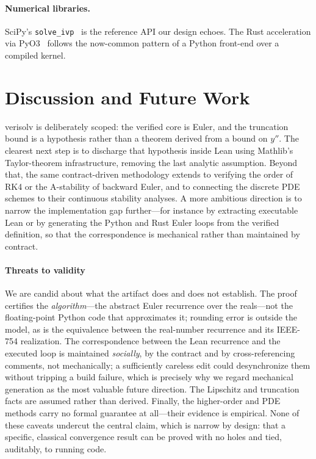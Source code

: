 \documentclass[sigplan,nonacm,screen,review]{acmart}
\begin{document}
\paragraph{Numerical libraries.}
SciPy's \texttt{solve\_ivp}~\cite{scipy2020} is the reference API our design
echoes. The Rust acceleration via PyO3~\cite{pyo3} follows the now-common pattern
of a Python front-end over a compiled kernel.

\section{Discussion and Future Work}
\label{sec:future}

verisolv is deliberately scoped: the verified core is Euler, and the truncation
bound is a hypothesis rather than a theorem derived from a bound on $y''$. The
clearest next step is to discharge that hypothesis inside Lean using Mathlib's
Taylor-theorem infrastructure, removing the last analytic assumption. Beyond
that, the same contract-driven methodology extends to verifying the order of RK4
or the A-stability of backward Euler, and to connecting the discrete PDE schemes
to their continuous stability analyses. A more ambitious direction is to narrow
the implementation gap further---for instance by extracting executable Lean or by
generating the Python and Rust Euler loops from the verified definition, so that
the correspondence is mechanical rather than maintained by contract.

\paragraph{Threats to validity}
We are candid about what the artifact does and does not establish. The proof
certifies the \emph{algorithm}---the abstract Euler recurrence over the reals---not
the floating-point Python code that approximates it; rounding error is outside the
model, as is the equivalence between the real-number recurrence and its IEEE-754
realization. The correspondence between the Lean recurrence and the executed loop
is maintained \emph{socially}, by the contract and by cross-referencing comments,
not mechanically; a sufficiently careless edit could desynchronize them without
tripping a build failure, which is precisely why we regard mechanical generation
as the most valuable future direction. The Lipschitz and truncation facts are
assumed rather than derived. Finally, the higher-order and PDE methods carry no
formal guarantee at all---their evidence is empirical. None of these caveats
undercut the central claim, which is narrow by design: that a specific, classical
convergence result can be proved with no holes and tied, auditably, to running
code.
\end{document}
